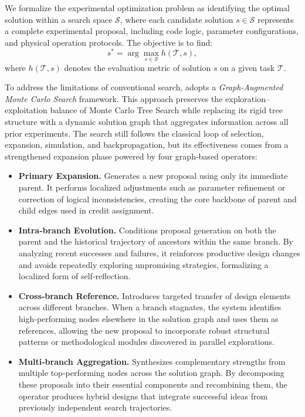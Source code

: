 We formalize the experimental optimization problem as identifying the optimal solution within a search space $\mathcal{S}$, where each candidate solution $s \in \mathcal{S}$ represents a complete experimental proposal, including code logic, parameter configurations, and physical operation protocols. The objective is to find:
\begin{equation}
s^* = \arg\max_{s \in \mathcal{S}} h(\mathcal{T}, s),
\label{eq:optimization_objective}
\end{equation}
where $h(\mathcal{T}, s)$ denotes the evaluation metric of solution $s$ on a given task $\mathcal{T}$.

To address the limitations of conventional search, {\ProjectName} adopts a \textit{Graph‑Augmented Monte Carlo Search} framework. This approach preserves the exploration–exploitation balance of Monte Carlo Tree Search while replacing its rigid tree structure with a dynamic solution graph that aggregates information across all prior experiments. The search still follows the classical loop of selection, expansion, simulation, and backpropagation, but its effectiveness comes from a strengthened expansion phase powered by four graph‑based operators:
\begin{itemize}
    \item \textbf{Primary Expansion.} Generates a new proposal using only its immediate parent. It performs localized adjustments such as parameter refinement or correction of logical inconsistencies, creating the core backbone of parent and child edges used in credit assignment.
    
    \item \textbf{Intra‑branch Evolution.} Conditions proposal generation on both the parent and the historical trajectory of ancestors within the same branch. By analyzing recent successes and failures, it reinforces productive design changes and avoids repeatedly exploring unpromising strategies, formalizing a localized form of self‑reflection.
    
    \item \textbf{Cross‑branch Reference.} Introduces targeted transfer of design elements across different branches. When a branch stagnates, the system identifies high‑performing nodes elsewhere in the solution graph and uses them as references, allowing the new proposal to incorporate robust structural patterns or methodological modules discovered in parallel explorations.
    
    \item \textbf{Multi‑branch Aggregation.} Synthesizes complementary strengths from multiple top‑performing nodes across the solution graph. By decomposing these proposals into their essential components and recombining them, the operator produces hybrid designs that integrate successful ideas from previously independent search trajectories.
\end{itemize}

